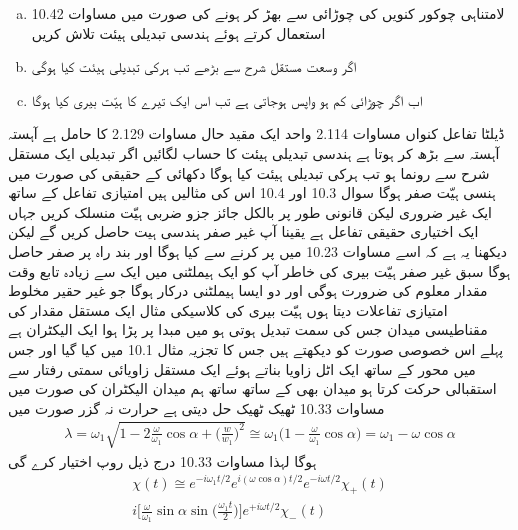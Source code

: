 \begin{enumerate}[a.]
\item
لامتناہی چوکور کنویں کی چوڑائی   سے بھڑ کر  ہونے کی صورت میں مساوات 10.42 استعمال کرتے ہوئے ہندسی تبدیلی ہیئت تلاش کریں 
\item
اگر وسعت مستقل شرح  سے بڑھے تب ہرکی تبدیلی ہیئت کیا ہوگی 
\item
اب اگر چوڑائی کم ہو واپس  ہوجاتی ہے تب اس ایک تیرے کا ہیّت بیری کیا ہوگا 
\end{enumerate}
ڈیلٹا تفاعل کنواں مساوات 2.114 واحد ایک مقید حال مساوات 2.129 کا حامل ہے  آہستہ آہستہ  سے بڑھ کر  ہوتا ہے ہندسی تبدیلی ہیئت کا حساب لگائیں اگر تبدیلی ایک مستقل شرح  سے رونما ہو تب ہرکی تبدیلی ہیئت کیا ہوگا 
دکھائی کے حقیقی  کی صورت میں ہنسی ہیّت صفر ہوگا سوال 10.3 اور 10.4 اس کی مثالیں ہیں امتیازی تفاعل کے ساتھ ایک غیر ضروری لیکن قانونی طور پر بالکل جائز جزو ضربی ہیّت منسلک کریں  جہاں  ایک اختیاری حقیقی تفاعل ہے یقینا آپ غیر صفر ہندسی ہيت حاصل کریں گے لیکن دیکھنا یہ ہے کہ اسے مساوات 10.23 میں پر کرنے سے کیا ہوگا اور بند راہ پر صفر حاصل ہوگا سبق غیر صفر ہیّت بیری کی خاطر آپ کو ایک ہیملٹنی میں ایک سے زیادہ تابع وقت مقدار معلوم کی ضرورت ہوگی اور دو  ایسا ہیملٹنی درکار ہوگا جو غیر حقیر  مخلوط امتیازی تفاعلات دیتا ہوں 
ہیّت بیری کی کلاسیکی مثال ایک مستقل مقدار کی مقناطیسی میدان جس کی سمت تبدیل ہوتی ہو میں مبدا پر پڑا ہوا ایک الیکٹران ہے پہلے اس خصوصی صورت کو دیکھتے ہیں جس کا تجزیہ مثال 10.1 میں کیا گیا اور جس میں محور  کے ساتھ ایک اٹل زاویا  بناتے ہوئے  ایک مستقل زاویائی سمتی رفتار  سے استقبالی حرکت کرتا ہو میدان بھی کے ساتھ ساتھ ہم میدان الیکٹران کی صورت میں مساوات 10.33 ٹھیک ٹھیک حل دیتی ہے حرارت نہ گزر صورت  میں 
\begin{align}
\lambda = \omega_1 \sqrt{1 - 2 \frac{\omega}{\omega_1} \cos \alpha + \big ( \frac{w}{w_1} \big )^2 } \cong \omega_1 \big ( 1 - \frac{\omega}{\omega_1} \cos \alpha \big ) = \omega_1 - \omega \cos \alpha
\end{align}
ہوگا لہذا مساوات 10.33 درج ذیل روپ اختیار کرے گی 
\begin{multline}
\chi (t) \cong e^{- i \omega_1 t/2} e^{i (\omega \cos \alpha) t/2} e^{- i \omega t/2} \chi_+(t) \\
i \big [ \frac{\omega}{\omega_1} \sin \alpha \sin \big ( \frac{\omega_1 t}{2} \big ) \big ]e^{+ i \omega t/2} \chi_{-} (t)
\end{multline}
